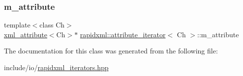 \subsubsection{\texorpdfstring{m\_attribute}{m\_attribute}}
{\footnotesize\ttfamily template$<$class Ch$>$ \\
\mbox{\hyperlink{classrapidxml_1_1xml__attribute}{xml\+\_\+attribute}}$<$Ch$>$$\ast$ \mbox{\hyperlink{classrapidxml_1_1attribute__iterator}{rapidxml\+::attribute\+\_\+iterator}}$<$ Ch $>$\+::m\+\_\+attribute\hspace{0.3cm}{\ttfamily [private]}}



The documentation for this class was generated from the following file\+:\begin{DoxyCompactItemize}
\item 
include/io/\mbox{\hyperlink{rapidxml__iterators_8hpp}{rapidxml\+\_\+iterators.\+hpp}}\end{DoxyCompactItemize}
